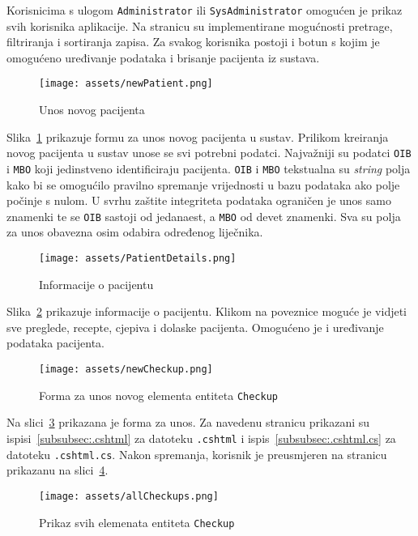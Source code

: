 Korisnicima s ulogom \texttt{Administrator} ili \texttt{SysAdministrator} omogućen je prikaz svih korisnika aplikacije. Na stranicu su implementirane mogućnosti pretrage, filtriranja i sortiranja zapisa. Za svakog korisnika postoji i botun s kojim je omogućeno uređivanje podataka i brisanje pacijenta iz sustava.

\begin{figure}[H]
	\texttt{[image: assets/newPatient.png]}
	\centering
	\caption{Unos novog pacijenta}
	\label{fig:newPatient}
\end{figure}

Slika~\ref{fig:newPatient} prikazuje formu za unos novog pacijenta u sustav. Prilikom kreiranja novog pacijenta u sustav unose se svi potrebni podatci. Najvažniji su podatci \texttt{OIB} i \texttt{MBO} koji jedinstveno identificiraju pacijenta. \texttt{OIB} i \texttt{MBO} tekstualna su \textit{string} polja kako bi se omogućilo pravilno spremanje vrijednosti u bazu podataka ako polje počinje s nulom. U svrhu zaštite integriteta podataka ograničen je unos samo znamenki te se \texttt{OIB} sastoji od jedanaest, a \texttt{MBO} od devet znamenki. Sva su polja za unos obavezna osim odabira određenog liječnika. 

\begin{figure}[H]
	\texttt{[image: assets/PatientDetails.png]}
	\centering
	\caption{Informacije o pacijentu}
	\label{fig:patientDetails}
\end{figure}

Slika~\ref{fig:patientDetails} prikazuje informacije o pacijentu. Klikom na poveznice moguće je vidjeti sve preglede, recepte, cjepiva i dolaske pacijenta. Omogućeno je i uređivanje podataka pacijenta.

\begin{figure}[H]
	\texttt{[image: assets/newCheckup.png]}
	\centering
	\caption{Forma za unos novog elementa entiteta \texttt{Checkup}}
	\label{fig:newCheckup}
\end{figure}

Na slici~\ref{fig:newCheckup} prikazana je forma za unos. Za navedenu stranicu prikazani su ispisi~\ref{subsubsec:.cshtml} za datoteku \texttt{.cshtml} i ispis~\ref{subsubsec:.cshtml.cs} za datoteku \texttt{.cshtml.cs}. Nakon spremanja, korisnik je preusmjeren na stranicu prikazanu na slici~\ref{fig:allCheckups}.

\begin{figure}[H]
	\texttt{[image: assets/allCheckups.png]}
	\centering
	\caption{Prikaz svih elemenata entiteta \texttt{Checkup}}
	\label{fig:allCheckups}
\end{figure}

